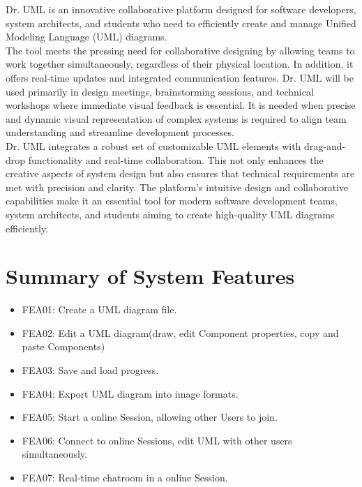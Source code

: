 \documentclass[12pt]{article}
\begin{document}
    Dr. UML is an innovative collaborative platform designed for software developers, system architects, and students who need to efficiently create and manage Unified Modeling Language (UML) diagrams.\\

    The tool meets the pressing need for collaborative designing by allowing teams to work together simultaneously, regardless of their physical location. In addition, it offers real-time updates and integrated communication features. Dr. UML will be used primarily in design meetings, brainstorming sessions, and technical workshops where immediate visual feedback is essential. It is needed when precise and dynamic visual representation of complex systems is required to align team understanding and streamline development processes.\\

    Dr. UML integrates a robust set of customizable UML elements with drag-and-drop functionality and real-time collaboration. This not only enhances the creative aspects of system design but also ensures that technical requirements are met with precision and clarity. The platform's intuitive design and collaborative capabilities make it an essential tool for modern software development teams, system architects, and students aiming to create high-quality UML diagrams efficiently.




    \section{Summary of System Features}

    \begin{itemize}
        \item FEA01: Create a UML diagram file.
        \item FEA02: Edit a UML diagram(draw, edit Component properties, copy and paste Components)
        \item FEA03: Save and load progress.
        \item FEA04: Export UML diagram into image formats.
        \item FEA05: Start a online Session, allowing other Users to join.
        \item FEA06: Connect to online Sessions, edit UML with other users simultaneously.
        \item FEA07: Real-time chatroom in a online Session.
    \end{itemize}
\end{document}
